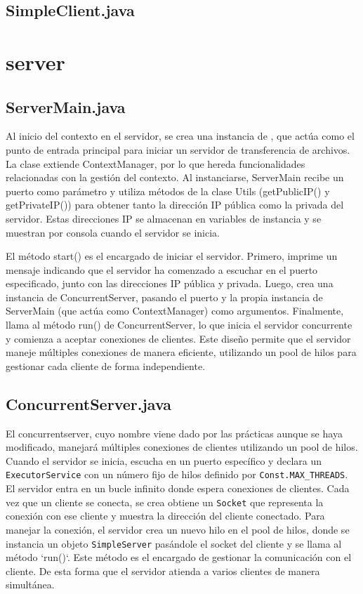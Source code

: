 \documentclass[a4paper, 12pt]{report}
\begin{document}
    \section{SimpleClient.java}

    \chapter{server}

    \section{ServerMain.java}

    Al inicio del contexto en el servidor, se crea una instancia de , que actúa como el punto de
    entrada principal para iniciar un servidor de transferencia de archivos. La clase extiende ContextManager,
    por lo que hereda funcionalidades relacionadas con la gestión del contexto. Al instanciarse, ServerMain recibe
    un puerto como parámetro y utiliza métodos de la clase Utils (getPublicIP() y getPrivateIP())
    para obtener tanto la dirección IP pública como la privada del
    servidor. Estas direcciones IP se almacenan en variables de instancia y se muestran por consola cuando el servidor se inicia.

    El método start()
    es el encargado de iniciar el servidor. Primero, imprime un mensaje
    indicando que el servidor ha comenzado a escuchar en el puerto
    especificado, junto con las direcciones IP pública y privada. Luego,
    crea una instancia de ConcurrentServer, pasando el puerto y la propia instancia de ServerMain (que actúa como ContextManager) como argumentos. Finalmente, llama al método run() de ConcurrentServer,
    lo que inicia el servidor concurrente y comienza a aceptar conexiones
    de clientes. Este diseño permite que el servidor maneje múltiples
    conexiones de manera eficiente, utilizando un pool de hilos para
    gestionar cada cliente de forma independiente.



    \section{ConcurrentServer.java}

    El concurrentserver, cuyo nombre viene dado por las prácticas aunque se haya modificado, manejará múltiples
    conexiones de clientes utilizando un pool de hilos. Cuando el servidor se inicia, escucha en un puerto
    específico y declara un \texttt{ExecutorService}  con un número fijo de hilos definido por
    \texttt{Const.MAX\_THREADS}. El servidor entra en un bucle infinito donde espera conexiones de clientes. Cada
    vez que un cliente se conecta, se crea obtiene un \texttt{Socket} que
    representa la conexión con ese cliente y muestra la dirección del cliente
    conectado. Para manejar la conexión, el servidor crea un nuevo hilo en el pool de hilos, donde se instancia un
    objeto \texttt{SimpleServer} pasándole el socket del cliente y se llama al método `run()`. Este método es el
    encargado de gestionar la comunicación con el cliente. De esta forma que el servidor atienda a varios
    clientes de manera simultánea.
\end{document}
